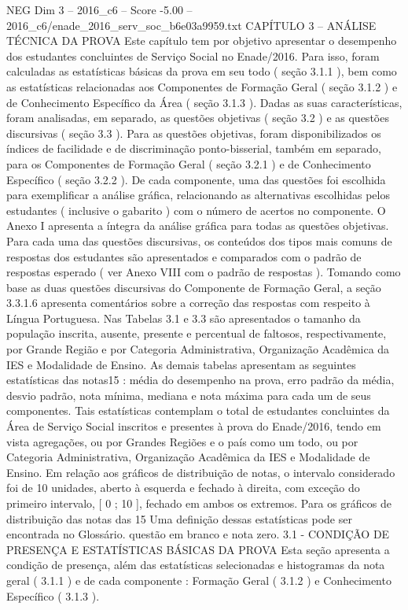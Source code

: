 \begin{textsample}{NEG Dim 3 – 2016\_c6 – Score -5.00 – 2016\_c6/enade\_2016\_serv\_soc\_b6e03a9959.txt}  \label{ex:f3_neg_037}
CAPÍTULO 3 – ANÁLISE TÉCNICA DA PROVA Este capítulo tem por objetivo apresentar o desempenho dos estudantes concluintes de Serviço Social no Enade/2016.
Para isso, foram calculadas as estatísticas básicas da prova em seu todo ( seção 3.1.1 ), bem como as estatísticas relacionadas aos Componentes de Formação Geral ( seção 3.1.2 ) e de Conhecimento Específico da Área ( seção 3.1.3 ).
Dadas as suas características, foram analisadas, em separado, as questões objetivas ( seção 3.2 ) e as questões discursivas ( seção 3.3 ).
Para as questões objetivas, foram disponibilizados os índices de facilidade e de discriminação ponto-bisserial, também em separado, para os Componentes de Formação Geral ( seção 3.2.1 ) e de Conhecimento Específico ( seção 3.2.2 ).
De cada componente, uma das questões foi escolhida para exemplificar a análise gráfica, relacionando as alternativas escolhidas pelos estudantes ( inclusive o gabarito ) com o número de acertos no componente.
O Anexo I apresenta a íntegra da análise gráfica para todas as questões objetivas.
Para cada uma das questões discursivas, os conteúdos dos tipos mais comuns de respostas dos estudantes são apresentados e comparados com o padrão de respostas esperado ( ver Anexo VIII com o padrão de respostas ).
Tomando como base as duas questões discursivas do Componente de Formação Geral, a seção 3.3.1.6 apresenta comentários sobre a correção das respostas com respeito à Língua Portuguesa.
Nas Tabelas 3.1 e 3.3 são apresentados o tamanho da população inscrita, ausente, presente e percentual de faltosos, respectivamente, por Grande Região e por Categoria Administrativa, Organização Acadêmica da IES e Modalidade de Ensino.
As demais tabelas apresentam as seguintes estatísticas das notas15 : média do desempenho na prova, erro padrão da média, desvio padrão, nota mínima, mediana e nota máxima para cada um de seus componentes.
Tais estatísticas contemplam o total de estudantes concluintes da Área de Serviço Social inscritos e presentes à prova do Enade/2016, tendo em vista agregações, ou por Grandes Regiões e o país como um todo, ou por Categoria Administrativa, Organização Acadêmica da IES e Modalidade de Ensino.
Em relação aos gráficos de distribuição de notas, o intervalo considerado foi de 10 unidades, aberto à esquerda e fechado à direita, com exceção do primeiro intervalo, [ 0 ; 10 ], fechado em ambos os extremos.
Para os gráficos de distribuição das notas das 15 Uma definição dessas estatísticas pode ser encontrada no Glossário. questão em branco e nota zero. 3.1 - CONDIÇÃO DE PRESENÇA E ESTATÍSTICAS BÁSICAS DA PROVA Esta seção apresenta a condição de presença, além das estatísticas selecionadas e histogramas da nota geral ( 3.1.1 ) e de cada componente : Formação Geral ( 3.1.2 ) e Conhecimento Específico ( 3.1.3 ).

\end{textsample}
